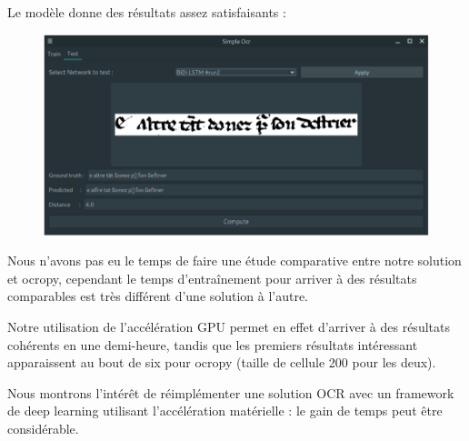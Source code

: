 \documentclass{report}
\begin{document}
Le modèle donne des résultats assez satisfaisants :

\begin{figure}[!htb]
	\begin{center}
		\includegraphics[width=0.7\linewidth]{img/screenshot-gui.png}
	\end{center}
\end{figure}

Nous n'avons pas eu le temps de faire une étude comparative entre notre solution et ocropy, cependant le temps d'entraînement pour arriver à des résultats comparables est très différent d'une solution à l'autre.

Notre utilisation de l'accélération GPU permet en effet d'arriver à des résultats cohérents en une demi-heure, tandis que les premiers résultats intéressant apparaissent au bout de six pour ocropy (taille de cellule 200 pour les deux).

Nous montrons l'intérêt de réimplémenter une solution OCR avec un framework de deep learning utilisant l'accélération matérielle : le gain de temps peut être considérable.

\appendix
\end{document}
